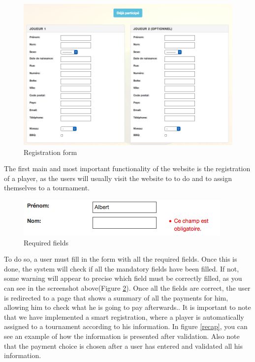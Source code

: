 \documentclass[a4paper, 12pt]{article}
\begin{document}
\begin{figure}[h]
\caption{\label{register} Registration form}
\includegraphics[scale=0.5]{playerform.png}
\end{figure}
\FloatBarrier

The first main and most important functionality of the website is the registration of a player, as the users will usually visit the website to to do and to assign themselves to a tournament.\\

\begin{figure}[h]
\caption{\label{obligatoire} Required fields}
\includegraphics[scale=0.7]{obligatoire.png}
\end{figure}
\FloatBarrier

To do so, a user must fill in the form with all the required fields. Once this is done, the system will check if all the mandatory fields have been filled. If not, some warning will appear to precise which field must be correctly filled, as you can see in the screenshot above(Figure \ref{obligatoire}). Once all the fields are correct, the user is redirected to a page that shows a summary of all the payments for him, allowing him to check what he is going to pay afterwards.. It is important to note that we have implemented a smart registration, where a player is automatically assigned to a tournament according to his information. In figure \ref{recap}, you can see an example of how the information is presented after validation. Also note that the payment choice is chosen after a user has entered and validated all his information.\\
\end{document}
